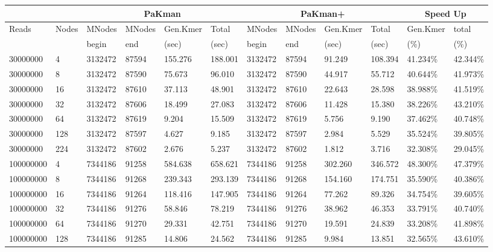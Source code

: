 \begin{tabular}{|l|l|l|l|l|l|l|l|l|l|l|l| }
\hline
\multicolumn{2}{|c|}{} & \multicolumn{4}{|c|}{{\sf PaKman} } & \multicolumn{4}{|c|}{{\sf PaKman+} } & \multicolumn{2}{|c|}{Speed Up} \\ 
\hline 
Reads & Nodes & MNodes & MNodes& Gen.Kmer & Total& MNodes & MNodes & Gen.Kmer & Total & Gen.Kmer & total \\\hline
 & & begin& end & (sec) & (sec) & begin & end & (sec) & (sec) & (\%) & (\%) \\\hline
30000000 &  4 & 3132472 & 87594 & 155.276& 188.001& 3132472 & 87594 & 91.249& 108.394 & 41.234\% & 42.344\% \\ \hline 
30000000 &  8 & 3132472 & 87590 & 75.673& 96.010& 3132472 & 87590 & 44.917& 55.712 & 40.644\% & 41.973\% \\ \hline 
30000000 &  16 & 3132472 & 87610 & 37.113& 48.901& 3132472 & 87610 & 22.643& 28.598 & 38.988\% & 41.519\% \\ \hline 
30000000 &  32 & 3132472 & 87606 & 18.499& 27.083& 3132472 & 87606 & 11.428& 15.380 & 38.226\% & 43.210\% \\ \hline 
30000000 &  64 & 3132472 & 87619 & 9.204& 15.509& 3132472 & 87619 & 5.756& 9.190 & 37.462\% & 40.748\% \\ \hline 
30000000 &  128 & 3132472 & 87597 & 4.627& 9.185& 3132472 & 87597 & 2.984& 5.529 & 35.524\% & 39.805\% \\ \hline 
30000000 &  224 & 3132472 & 87602 & 2.676& 5.237& 3132472 & 87602 & 1.812& 3.716 & 32.308\% & 29.045\% \\ \hline 
100000000 &  4 & 7344186 & 91258 & 584.638& 658.621& 7344186 & 91258 & 302.260& 346.572 & 48.300\% & 47.379\% \\ \hline 
100000000 &  8 & 7344186 & 91268 & 239.343& 293.139& 7344186 & 91268 & 154.160& 174.751 & 35.590\% & 40.386\% \\ \hline 
100000000 &  16 & 7344186 & 91264 & 118.416& 147.905& 7344186 & 91264 & 77.262& 89.326 & 34.754\% & 39.605\% \\ \hline 
100000000 &  32 & 7344186 & 91276 & 58.846& 78.219& 7344186 & 91276 & 38.962& 46.353 & 33.791\% & 40.740\% \\ \hline 
100000000 &  64 & 7344186 & 91270 & 29.331& 42.751& 7344186 & 91270 & 19.591& 24.839 & 33.208\% & 41.898\% \\ \hline 
100000000 &  128 & 7344186 & 91285 & 14.806& 24.562& 7344186 & 91285 & 9.984& 13.851 & 32.565\% & 43.610\% \\ \hline 

\end{tabular}
